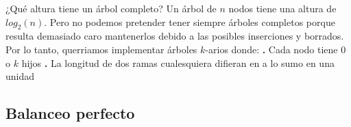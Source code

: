\documentclass[10pt,a4paper]{article}
\begin{document}
¿Qué altura tiene un árbol completo? Un árbol de $n$ nodos tiene una altura de $log_{2}(n)$.
\newline
\newline
Pero no podemos pretender tener siempre árboles completos porque resulta demasiado caro mantenerlos debido a las posibles inserciones y borrados.
\newline
\newline
Por lo tanto, querriamos implementar árboles $k$-arios donde:
\newline
\newline
\textbf{.} Cada nodo tiene 0 o $k$ hijos
\newline
\newline
\textbf{.} La longitud de dos ramas cualesquiera difieran en a lo sumo en una unidad

\subsection{Balanceo perfecto}
\end{document}
